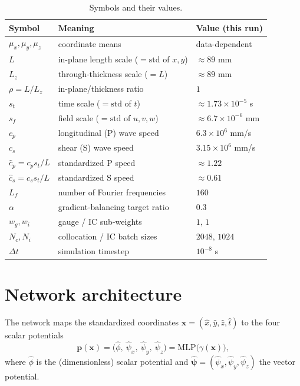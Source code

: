\documentclass[11pt]{article}
\newcommand{\xh}{\hat{x}} \newcommand{\yh}{\hat{y}} \newcommand{\zh}{\hat{z}}
\newcommand{\tht}{\hat{t}}
\newcommand{\phih}{\hat{\phi}} \newcommand{\psih}{\hat{\psi}}
\newcommand{\cph}{\hat{c}_p} \newcommand{\csh}{\hat{c}_s}
\begin{document}
\begin{table}[h]
\centering\small
\begin{tabular}{lll}
\toprule
Symbol & Meaning & Value (this run) \\
\midrule
$\mu_x,\mu_y,\mu_z$ & coordinate means & data-dependent \\
$L$ & in-plane length scale ($=\!\mathrm{std}$ of $x,y$) & $\approx 89$ mm \\
$L_z$ & through-thickness scale ($=L$) & $\approx 89$ mm \\
$\rho=L/L_z$ & in-plane/thickness ratio & $1$ \\
$s_t$ & time scale ($=\!\mathrm{std}$ of $t$) & $\approx 1.73\times10^{-5}$ s \\
$s_f$ & field scale ($=\!\mathrm{std}$ of $u,v,w$) & $\approx 6.7\times10^{-6}$ mm \\
$c_p$ & longitudinal (P) wave speed & $6.3\times10^{6}$ mm/s \\
$c_s$ & shear (S) wave speed & $3.15\times10^{6}$ mm/s \\
$\cph=c_p s_t/L$ & standardized P speed & $\approx 1.22$ \\
$\csh=c_s s_t/L$ & standardized S speed & $\approx 0.61$ \\
$L_f$ & number of Fourier frequencies & $160$ \\
$\alpha$ & gradient-balancing target ratio & $0.3$ \\
$w_g,w_i$ & gauge / IC sub-weights & $1,\,1$ \\
$N_c,N_i$ & collocation / IC batch sizes & $2048,\,1024$ \\
$\Delta t$ & simulation timestep & $10^{-8}$ s \\
\bottomrule
\end{tabular}
\caption{Symbols and their values.}
\label{tab:sym}
\end{table}

\section{Network architecture}
\label{sec:arch}
The network maps the standardized coordinates $\mathbf{x}=(\xh,\yh,\zh,\tht)$ to
the four scalar potentials
\begin{equation}
\mathbf{p}(\mathbf{x}) = \big(\phih,\ \psih_x,\ \psih_y,\ \psih_z\big)
= \mathrm{MLP}\big(\gamma(\mathbf{x})\big),
\end{equation}
where $\phih$ is the (dimensionless) scalar potential and
$\boldsymbol{\psih}=(\psih_x,\psih_y,\psih_z)$ the vector potential.
\end{document}
